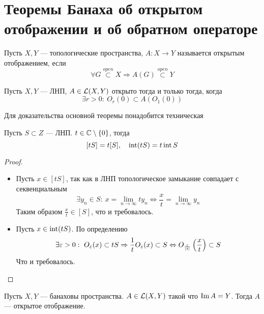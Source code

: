 \newpage
\section{Теоремы Банаха об открытом отображении и об обратном операторе}
\begin{definition}
	Пусть $X,Y$ --- топологические пространства, $A\colon X \to Y$ называется открытым отображением, если
	$$
	\forall G \stackrel{open}{\subset} X \Rightarrow A(G) \stackrel{open}{\subset} Y
	$$
\end{definition}
\begin{claim}
	Пусть $X,Y$ --- ЛНП, $A \in \mathcal{L}(X,Y)$ открыто тогда и только тогда, когда
	$$
	\exists r > 0 : \ O_r(0) \subset A(O_1(0))
	$$
\end{claim}
Для доказательства основной теоремы понадобится техническая 
\begin{lemma}
	Пусть $S \subset Z$ --- ЛНП. $t \in \mathbb{C} \setminus \{0\}$, тогда
	$$
	[tS] = t[S], \quad \operatorname{int} (tS) = t \operatorname{int} S
	$$
\end{lemma}
\begin{proof}
	\hfill
	\begin{itemize}
		\item 	Пусть $x \in [tS]$, так как в ЛНП топологическое замыкание совпадает с секвенциальным
		$$
		\exists y_n \in S: \ x = \lim\limits_{n \to \infty} t y_n  \Leftrightarrow \frac{x}{t} = \lim\limits_{n \to \infty} y_n
		$$
		Таким образом $\frac{x}{t}\in [S]$, что и требовалось.
		\item Пусть $ x \in \operatorname{int}(tS)$. По определению
		$$
		\exists \eps > 0 : \ O_\eps(x) \subset t S \Rightarrow \frac{1}{t}O_\eps(x) \subset S \Leftrightarrow O_{\frac{\eps}{|t|}}\left(\frac{x}{t}\right) \subset S
		$$
		Что и требовалось.
	\end{itemize}
\end{proof}
\begin{theorem}\label{th:banachopenmap}
	Пусть $X,Y$ --- банаховы пространства. $A \in \mathcal{L}(X,Y)$ такой что $\operatorname{Im} A = Y$. Тогда $A$ --- открытое отображение.
\end{theorem}
